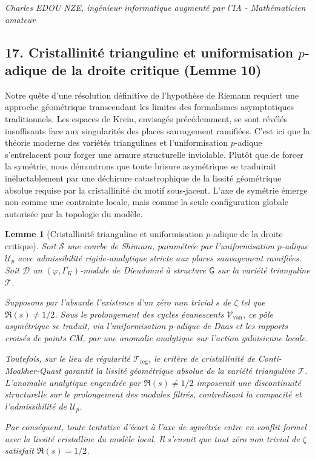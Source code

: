 \documentclass[
]{article}
\newtheorem{lemma}{Lemme}
\begin{document}
\vspace{1cm}
\begin{flushright}
\textit{Charles EDOU NZE, ingénieur informatique augmenté par l'IA - Mathématicien amateur}
\end{flushright}



\subsection{17. Cristallinité trianguline et uniformisation $p$-adique de la droite critique (Lemme 10)}
Notre quête d'une résolution définitive de l'hypothèse de Riemann requiert une approche géométrique transcendant les limites des formalismes asymptotiques traditionnels. Les espaces de Krein, envisagés précédemment, se sont révélés insuffisants face aux singularités des places sauvagement ramifiées. C'est ici que la théorie moderne des variétés triangulines et l'uniformisation $p$-adique s'entrelacent pour forger une armure structurelle inviolable. Plutôt que de forcer la symétrie, nous démontrons que toute brisure asymétrique se traduirait inéluctablement par une déchirure catastrophique de la lissité géométrique absolue requise par la cristallinité du motif sous-jacent. L'axe de symétrie émerge non comme une contrainte locale, mais comme la seule configuration globale autorisée par la topologie du modèle.

\begin{lemma}[Cristallinité trianguline et uniformisation $p$-adique de la droite critique]
    Soit $\mathcal{S}$ une courbe de Shimura, paramétrée par l'uniformisation $p$-adique $\mathcal{U}_p$ avec admissibilité rigide-analytique stricte aux places sauvagement ramifiées. Soit $\mathcal{D}$ un $(\varphi,\Gamma_K)$-module de Dieudonné à structure $\mathsf{G}$ sur la variété trianguline $\mathcal{T}$.

    Supposons par l'absurde l'existence d'un zéro non trivial $s$ de $\zeta$ tel que $\Re(s) \neq 1/2$. Sous le prolongement des cycles évanescents $\mathcal{V}_{\text{van}}$, ce pôle asymétrique se traduit, via l'uniformisation $p$-adique de Daas et les rapports croisés de points CM, par une anomalie analytique sur l'action galoisienne locale.

    Toutefois, sur le lieu de régularité $\mathcal{T}_{\text{reg}}$, le critère de cristallinité de Conti-Moakher-Quast garantit la lissité géométrique absolue de la variété trianguline $\mathcal{T}$. L'anomalie analytique engendrée par $\Re(s) \neq 1/2$ imposerait une discontinuité structurelle sur le prolongement des modules filtrés, contredisant la compacité et l'admissibilité de $\mathcal{U}_p$.

    Par conséquent, toute tentative d'écart à l'axe de symétrie entre en conflit formel avec la lissité cristalline du modèle local. Il s'ensuit que tout zéro non trivial de $\zeta$ satisfait $\Re(s) = 1/2$.
\end{lemma}
\end{document}
